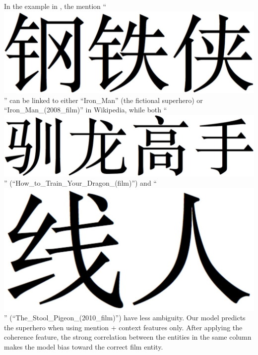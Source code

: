 In the example in , the mention 
``
\includegraphics[height=1.3\fontcharht\font`\B]{figures/gangtiexia.png} 
'' can be linked to either
``Iron\_Man'' (the fictional superhero) or ``Iron\_Man\_(2008\_film)'' 
in Wikipedia, while both ``
\includegraphics[height=1.3\fontcharht\font`\B]{figures/xunlong.png} 
'' (``How\_to\_Train\_Your\_Dragon\_(film)'') and
``
\includegraphics[height=1.3\fontcharht\font`\B]{figures/xianren.png} 
'' (``The\_Stool\_Pigeon\_(2010\_film)'') have less ambiguity.
Our model predicts the superhero when using mention + context features only.
After applying the coherence feature, 
the strong correlation between the entities in the same column
makes the model bias toward the correct film entity.




